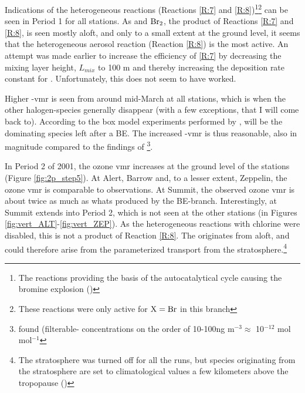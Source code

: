 \medskip

Indications of the heterogeneous reactions (Reactions \ref{R:7} and \ref{R:8})\footnote{The reactions providing the basis of the autocatalytical cycle causing the bromine explosion (\cite{Simpson2015})}\footnote{These reactions were only active for $\mathrm{X} = \mathrm{Br}$ in this branch} can be seen in Period 1 for all stations. As  and $\mathrm{Br_2}$, the product of Reactions \ref{R:7} and \ref{R:8}, is seen mostly aloft, and only to a small extent at the ground level, it seems that the heterogeneous aerosol reaction (Reaction \ref{R:8}) is the most active. An attempt was made earlier to increase the efficiency of \ref{R:7} by decreasing the mixing layer height, $L_{mix}$ to 100 m and thereby increasing the deposition rate constant for . Unfortunately, this does not seem to have worked. 

\medskip

Higher -\acrshort{vmr} is seen from around mid-March at all stations, which is when the other halogen-species generally disappear (with a few exceptions, that I will come back to). According to the box model experiments performed by \cite{CAO},  will be the dominating species left after a BE. The increased -\acrshort{vmr} is thus reasonable, also in magnitude compared to the findings of \cite{barrie}\footnote{\cite{barrie} found  (filterable- concentrations on the order of 10-100ng m$^{-3} \approx$ 10$^{-12}$ mol mol$^{-1}$}. 

\medskip

In Period 2 of 2001, the ozone \acrshort{vmr} increases at the ground level of the stations (Figure \ref{fig:2p_step5}). At Alert, Barrow and, to a lesser extent, Zeppelin, the ozone \acrshort{vmr} is comparable to observations. At Summit, the observed ozone \acrshort{vmr} is about twice as much as whats produced by the BE-branch. Interestingly,  at Summit extends into Period 2, which is not seen at the other stations (in Figures \ref{fig:vert_ALT}-\ref{fig:vert_ZEP}). As the heterogeneous reactions with chlorine were disabled, this is not a product of Reaction \ref{R:8}. The  originates from aloft, and could therefore arise from the parameterized transport from the stratosphere.\footnote{The stratosphere was turned off for all the runs, but species originating from the stratosphere are set to climatological values a few kilometers above the tropopause (\cite{Sovde2012})} 

\medskip

